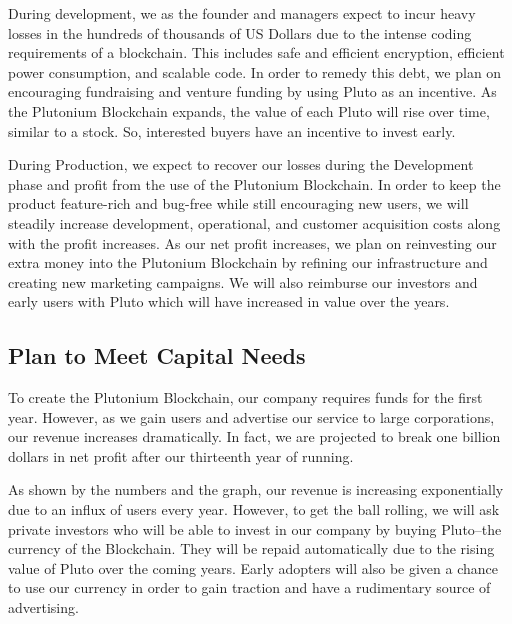 \documentclass[12pt]{article}
\begin{document}
During development, we as the founder and managers expect to incur heavy losses in the hundreds of thousands of US Dollars due to the intense coding requirements of a blockchain. This includes safe and efficient encryption, efficient power consumption, and scalable code. In order to remedy this debt, we plan on encouraging fundraising and venture funding by using Pluto as an incentive. As the Plutonium Blockchain expands, the value of each Pluto will rise over time, similar to a stock. So, interested buyers have an incentive to invest early.

During Production, we expect to recover our losses during the Development phase and profit from the use of the Plutonium Blockchain. In order to keep the product feature-rich and bug-free while still encouraging new users, we will steadily increase development, operational, and customer acquisition costs along with the profit increases. As our net profit increases, we plan on reinvesting our extra money into the Plutonium Blockchain by refining our infrastructure and creating new marketing campaigns. We will also reimburse our investors and early users with Pluto which will have increased in value over the years. 
\pagebreak
\subsection{Plan to Meet Capital Needs}
To create the Plutonium Blockchain, our company requires funds for the first year. However, as we gain users and advertise our service to large corporations, our revenue increases dramatically. In fact, we are projected to break one billion dollars in net profit after our thirteenth year of running.

As shown by the numbers and the graph, our revenue is increasing exponentially due to an influx of users every year. However, to get the ball rolling, we will ask private investors who will be able to invest in our company by buying Pluto--the currency of the Blockchain. They will be repaid automatically due to the rising value of Pluto over the coming years. Early adopters will also be given a chance to use our currency in order to gain traction and have a rudimentary source of advertising.
\pagebreak
\end{document}
